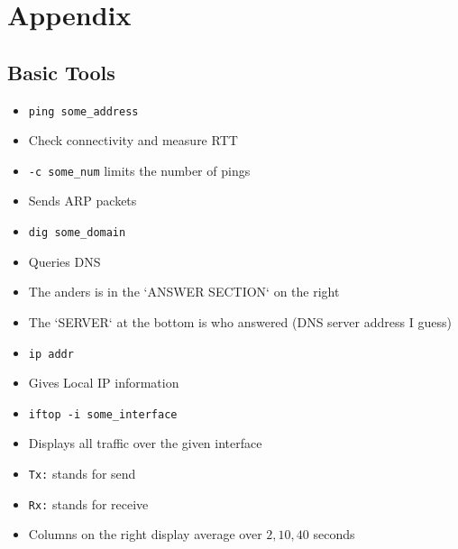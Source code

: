 
\section{Appendix}
\begin{itemize}
\end{itemize}

\subsection{Basic Tools}
\begin{itemize}
        \begin{itemize}
            \item \verb+ping some_address+
            \item Check connectivity and measure RTT
            \item \verb+-c some_num+ limits the number of pings
            \item Sends ARP packets
        \end{itemize}
        \begin{itemize}
            \item \verb+dig some_domain+
            \item Queries DNS
            \item The anders is in the `ANSWER SECTION` on the right
            \item The `SERVER` at the bottom is who answered (DNS server address I guess)
        \end{itemize}
        \begin{itemize}
            \item \verb+ip addr+
            \item Gives Local IP information
        \end{itemize}
        \begin{itemize}
            \item \verb+iftop -i some_interface+
            \item Displays all traffic over the given interface
            \item \verb+Tx:+ stands for send
            \item \verb+Rx:+ stands for receive
            \item Columns on the right display average over $2, 10, 40$ seconds
        \end{itemize}

\end{itemize}
